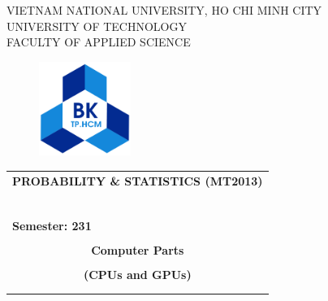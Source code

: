 \documentclass[a4paper]{article}
\begin{document}
\begin{titlepage}
\begin{center}
VIETNAM NATIONAL UNIVERSITY, HO CHI MINH CITY \\
UNIVERSITY OF TECHNOLOGY \\
FACULTY OF APPLIED SCIENCE
\end{center}

\vspace{1cm}

\begin{figure}[h!]
\begin{center}
\includegraphics[width=3cm]{graphics/hcmut.png}
\end{center}
\end{figure}

\vspace{1cm}


\begin{center}
\begin{tabular}{c}
\multicolumn{1}{l}{\textbf{{\Large PROBABILITY \& STATISTICS (MT2013)}}}\\
~~\\
\hline
\\
\multicolumn{1}{l}{\textbf{{Semester: 231}}}\\
\\
\textbf{{\Huge Computer Parts}}\\
\\
\textbf{{\Huge (CPUs and GPUs)}}\\[10pt]

\multicolumn{1}{l}{\textbf{{}}}\\
\\
\hline
\end{tabular}
\end{center}

\vspace{2cm}


\end{titlepage}
\end{document}
